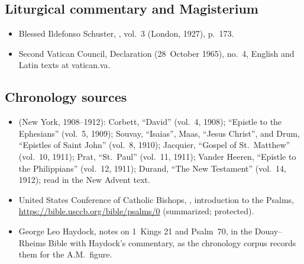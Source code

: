 {\subsection*{Liturgical commentary and Magisterium}
\begin{itemize}[itemsep=0pt,topsep=.2em]
\item Blessed Ildefonso Schuster, , vol.~3 (London, 1927), p.~173.
\item Second Vatican Council, Declaration  (28~October 1965), no.~4, English and Latin texts at vatican.va.
\end{itemize}

\subsection*{Chronology sources}
\begin{itemize}[itemsep=0pt,topsep=.2em]
\item {} (New York, 1908--1912): Corbett, ``David'' (vol.~4, 1908); ``Epistle to the Ephesians'' (vol.~5, 1909); Souvay, ``Isaias'', Maas, ``Jesus Christ'', and Drum, ``Epistles of Saint John'' (vol.~8, 1910); Jacquier, ``Gospel of St.~Matthew'' (vol.~10, 1911); Prat, ``St.~Paul'' (vol.~11, 1911); Vander Heeren, ``Epistle to the Philippians'' (vol.~12, 1911); Durand, ``The New Testament'' (vol.~14, 1912); read in the New Advent text.
\item United States Conference of Catholic Bishops, , introduction to the Psalms, \url{https://bible.usccb.org/bible/psalms/0} (summarized; protected).
\item George Leo Haydock, notes on 1~Kings 21 and Psalm~70, in the Douay--Rheims Bible with Haydock's commentary, as the chronology corpus records them for the A.M.\ figure.
\end{itemize}
\par}
